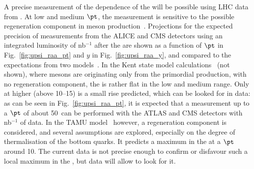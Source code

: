\documentclass[../report.tex]{subfiles}
\begin{document}
A precise measurement of the \pt dependence of the  \raa will be possible using LHC data from \RunsThreeFour. At low and medium $\pt$, the measurement is
sensitive to the possible regeneration component in \PGU meson production~\cite{Du:2017qkv}. Projections for the expected precision of \PGU measurements from the ALICE and CMS detectors
using an integrated luminosity of \unit[10]{nb}$^{-1}$ after the \RunsThreeFour are shown as a function of $\pt$ in Fig.~\ref{fig:upsi_raa_pt} and $y$ in Fig.~\ref{fig:upsi_raa_y}, and compared to the expectations from two 
models~\cite{Krouppa:2017jlg,Du:2017qkv}. In the Kent state model calculations~\cite{Krouppa:2017jlg} (not shown), where \PgU mesons are originating only from the primordial
production, with no regeneration component, the \raa is rather flat in the low and medium \pt range.
Only at higher \pt (above 10--15\UGeVc) is a small rise predicted, which can be looked for in \RunsThreeFour data: as can be seen in Fig.~\ref{fig:upsi_raa_pt}, it is expected that a measurement up to a $\pt$ of about 50\UGeVc\ can be performed with the ATLAS and CMS detectors with
\unit[10]{nb}$^{-1}$ of data. 
In the TAMU model~\cite{Du:2017qkv} however, a regeneration
component is considered, and several assumptions are explored, especially on the degree of thermalisation of the bottom quarks. 
It predicts a maximum in the  \raa at a $\pt$ around 10\UGeVc. The current data is not precise enough to confirm or disfavour such a local maximum in the \raa, but \RunsThreeFour 
data will allow to look for it.
\end{document}
